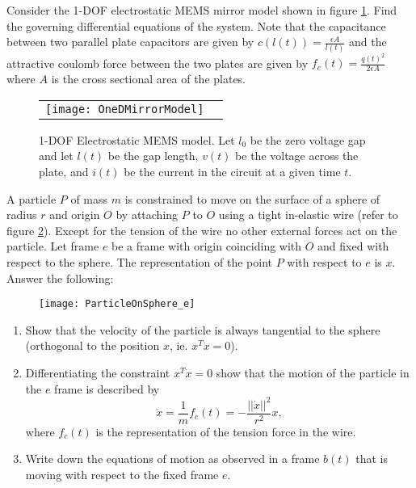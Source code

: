\documentclass[graybox,envcountchap,sectrefs]{svmonoMuga}
\begin{document}
\begin{exercise}
Consider the 1-DOF electrostatic MEMS mirror model  shown in figure \ref{Fig:1D_MEMS}. Find the governing differential equations of the system. Note that the capacitance between 
two parallel plate capacitors are given by $c(l(t))=\frac{\epsilon A}{l(t)}$ and the attractive coulomb force between the two plates are given by $f_e(t)=\frac{q(t)^2}{2\epsilon A}$ where 
$A$ is the cross sectional area of the plates.

\begin{figure}[ht]
\begin{center}
\begin{tabular}{cc}
\texttt{[image: OneDMirrorModel]}
\end{tabular}
\caption{1-DOF Electrostatic MEMS model. Let $l_0$ be the zero voltage gap and let $l(t)$ be the gap length, $v(t)$ be the voltage across the plate, and  $i(t)$ be the current in the circuit at a given time $t$.} \label{Fig:1D_MEMS}
\end{center}
\end{figure}
\end{exercise}


\begin{exercise}\label{ex:ParticleOnSphere}
A particle $P$ of mass $m$ is constrained to move on the surface of a sphere of radius $r$ and origin $O$ by attaching $P$ to $O$ using a tight in-elastic wire (refer to figure 
\ref{Fig:ParticleOnSphere0}). Except for the tension of the wire no other external forces act on the particle. Let frame $e$ be a frame with origin coinciding with $O$ and fixed with 
respect to the sphere. The representation of the point $P$ with respect to $e$ is $x$. Answer the following:
\begin{figure}[ht]
\begin{center}
\texttt{[image: ParticleOnSphere\_e]}
\renewcommand{\baselinestretch}{1}\selectfont
\caption{}
\label{Fig:ParticleOnSphere0}
\renewcommand{\baselinestretch}{1.5}\selectfont
\end{center}
\end{figure}


\begin{enumerate}
\item \label{ex:ParticleOnSphere1} Show that the velocity of the particle is always tangential to the sphere (orthogonal to the position $x$, ie. $x^T\dot{x}=0$).
\item \label{ex:ParticleOnSphere3} Differentiating the constraint $x^T\dot{x}=0$ show that the motion of the particle in the $e$ frame is described by
\[
\ddot{x}=\frac{1}{m}f_c(t)=-\frac{||\dot{x}||^2}{r^2} x,
\]
where $f_c(t)$ is the representation of the tension force in the wire.
\item Write down the equations of motion as observed in a frame $b(t)$ that is moving with respect to the fixed frame $e$.

\end{enumerate}
\end{exercise}
\end{document}
